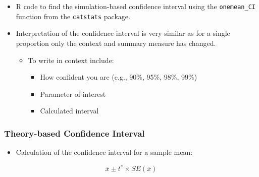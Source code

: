 \documentclass[
]{report}
\newenvironment{Shaded}{\begin{snugshade}}{\end{snugshade}}
\newcommand{\AttributeTok}[1]{\textcolor[rgb]{0.13,0.29,0.53}{#1}}
\newcommand{\CommentTok}[1]{\textcolor[rgb]{0.56,0.35,0.01}{\textit{#1}}}
\newcommand{\DecValTok}[1]{\textcolor[rgb]{0.00,0.00,0.81}{#1}}
\newcommand{\FunctionTok}[1]{\textcolor[rgb]{0.13,0.29,0.53}{\textbf{#1}}}
\newcommand{\NormalTok}[1]{#1}
\newcommand{\SpecialCharTok}[1]{\textcolor[rgb]{0.81,0.36,0.00}{\textbf{#1}}}
\newcommand{\StringTok}[1]{\textcolor[rgb]{0.31,0.60,0.02}{#1}}
\providecommand{\tightlist}{%
  \setlength{\itemsep}{0pt}\setlength{\parskip}{0pt}}
\begin{document}
\begin{itemize}
\item
  R code to find the simulation-based confidence interval using the \texttt{onemean\_CI} function from the \texttt{catstats} package.

\begin{Shaded}
\end{Shaded}
\item
  Interpretation of the confidence interval is very similar as for a single proportion only the context and summary measure has changed.

  \begin{itemize}
  \item
    To write in context include:

    \begin{itemize}
    \item
      How confident you are (e.g., 90\%, 95\%, 98\%, 99\%)
    \item
      Parameter of interest
    \item
      Calculated interval
    \end{itemize}
  \end{itemize}
\end{itemize}

\subsubsection*{Theory-based Confidence Interval}\label{theory-based-confidence-interval}

\begin{itemize}
\tightlist
\item
  Calculation of the confidence interval for a sample mean:
\end{itemize}

\[\bar{x}\pm t^*\times SE(\bar{x})\]
\end{document}
